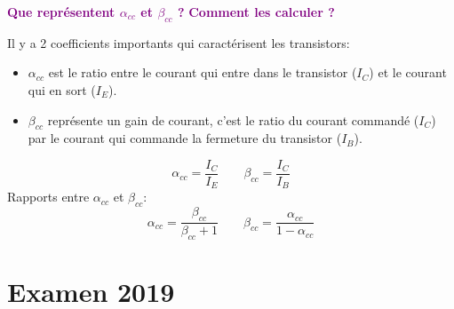 \documentclass[a4paper]{article}
\begin{document}
\begin{center}
    \textcolor{purple}{\textbf{Que représentent $ \alpha_{cc} $ et $ \beta_{cc} $ ?}}
    \textcolor{purple}{\textbf{Comment les calculer ?}}
\end{center}
Il y a 2 coefficients importants qui caractérisent les transistors:
\begin{itemize}
    \item $ \alpha_{cc} $ est le ratio entre le courant qui entre dans le transistor ($ I_C $) et le courant qui en sort ($ I_E $).
    \item $ \beta_{cc} $ représente un gain de courant, c'est le ratio du courant commandé ($ I_C $) par le courant qui commande la fermeture du transistor ($ I_B $).
\end{itemize}
\[
    \alpha_{cc} = \frac{I_C}{I_E}
    \qquad
    \beta_{cc} = \frac{I_C}{I_B}
\]
Rapports entre $ \alpha_{cc} $ et $ \beta_{cc} $:
\[
    \alpha_{cc} = \frac{\beta_{cc}}{\beta_{cc} + 1}
    \qquad
    \beta_{cc} = \frac{\alpha_{cc}}{1 - \alpha_{cc}}
\]















\section{Examen 2019}
\end{document}
